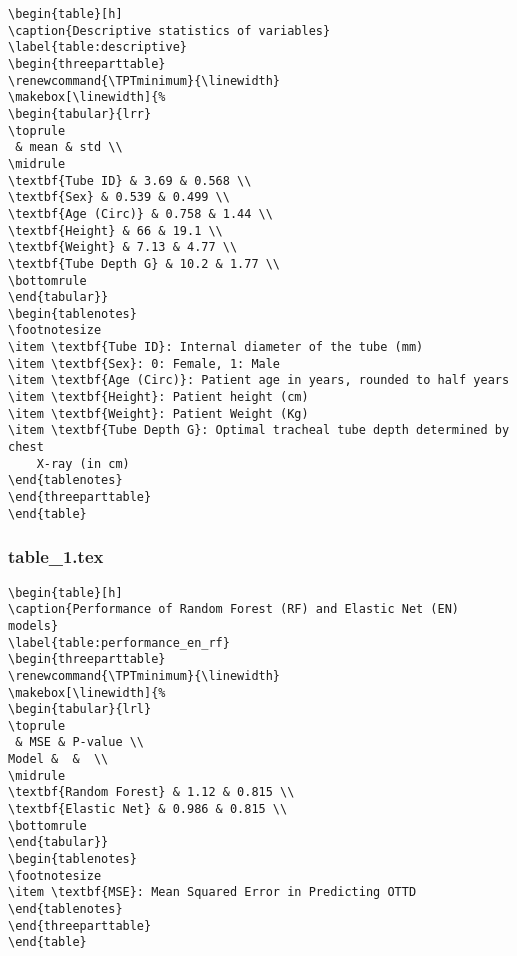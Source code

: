 \documentclass[11pt]{article}
\begin{document}
\begin{Verbatim}[tabsize=4]
\begin{table}[h]
\caption{Descriptive statistics of variables}
\label{table:descriptive}
\begin{threeparttable}
\renewcommand{\TPTminimum}{\linewidth}
\makebox[\linewidth]{%
\begin{tabular}{lrr}
\toprule
 & mean & std \\
\midrule
\textbf{Tube ID} & 3.69 & 0.568 \\
\textbf{Sex} & 0.539 & 0.499 \\
\textbf{Age (Circ)} & 0.758 & 1.44 \\
\textbf{Height} & 66 & 19.1 \\
\textbf{Weight} & 7.13 & 4.77 \\
\textbf{Tube Depth G} & 10.2 & 1.77 \\
\bottomrule
\end{tabular}}
\begin{tablenotes}
\footnotesize
\item \textbf{Tube ID}: Internal diameter of the tube (mm)
\item \textbf{Sex}: 0: Female, 1: Male
\item \textbf{Age (Circ)}: Patient age in years, rounded to half years
\item \textbf{Height}: Patient height (cm)
\item \textbf{Weight}: Patient Weight (Kg)
\item \textbf{Tube Depth G}: Optimal tracheal tube depth determined by chest
	X-ray (in cm)
\end{tablenotes}
\end{threeparttable}
\end{table}

\end{Verbatim}

\subsubsection*{table\_1.tex}

\begin{Verbatim}[tabsize=4]
\begin{table}[h]
\caption{Performance of Random Forest (RF) and Elastic Net (EN) models}
\label{table:performance_en_rf}
\begin{threeparttable}
\renewcommand{\TPTminimum}{\linewidth}
\makebox[\linewidth]{%
\begin{tabular}{lrl}
\toprule
 & MSE & P-value \\
Model &  &  \\
\midrule
\textbf{Random Forest} & 1.12 & 0.815 \\
\textbf{Elastic Net} & 0.986 & 0.815 \\
\bottomrule
\end{tabular}}
\begin{tablenotes}
\footnotesize
\item \textbf{MSE}: Mean Squared Error in Predicting OTTD
\end{tablenotes}
\end{threeparttable}
\end{table}

\end{Verbatim}
\end{document}
